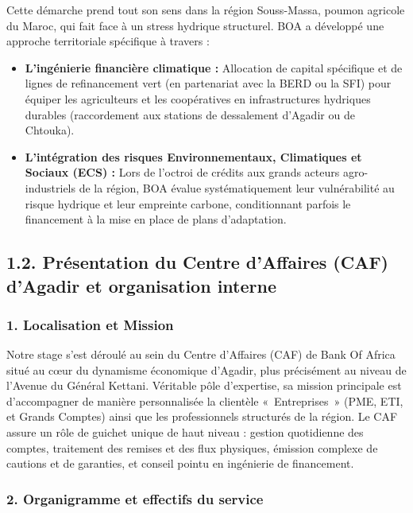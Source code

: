 \documentclass[12pt,a4paper]{report}
\begin{document}
Cette démarche prend tout son sens dans la région Souss-Massa, poumon agricole du Maroc, qui fait face à un stress hydrique structurel. BOA a développé une approche territoriale spécifique à travers :

\begin{itemize}
  \item \textbf{L'ingénierie financière climatique :} Allocation de capital spécifique et de lignes de refinancement vert (en partenariat avec la BERD ou la SFI) pour équiper les agriculteurs et les coopératives en infrastructures hydriques durables (raccordement aux stations de dessalement d'Agadir ou de Chtouka).

  \item \textbf{L'intégration des risques Environnementaux, Climatiques et Sociaux (ECS) :} Lors de l'octroi de crédits aux grands acteurs agro-industriels de la région, BOA évalue systématiquement leur vulnérabilité au risque hydrique et leur empreinte carbone, conditionnant parfois le financement à la mise en place de plans d'adaptation.
\end{itemize}

\subsection*{1.2. Présentation du Centre d'Affaires (CAF) d'Agadir et organisation interne}

\subsubsection*{1. Localisation et Mission}

Notre stage s'est déroulé au sein du Centre d'Affaires (CAF) de Bank Of Africa situé au c\oe{}ur du dynamisme économique d'Agadir, plus précisément au niveau de l'Avenue du Général Kettani. Véritable pôle d'expertise, sa mission principale est d'accompagner de manière personnalisée la clientèle «~Entreprises~» (PME, ETI, et Grands Comptes) ainsi que les professionnels structurés de la région. Le CAF assure un rôle de guichet unique de haut niveau : gestion quotidienne des comptes, traitement des remises et des flux physiques, émission complexe de cautions et de garanties, et conseil pointu en ingénierie de financement.

\subsubsection*{2. Organigramme et effectifs du service}
\end{document}
